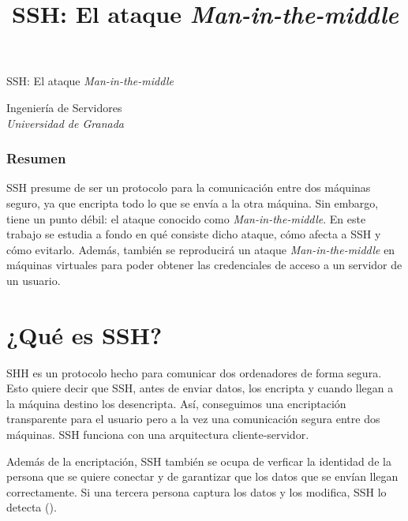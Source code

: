 \documentclass[10pt,a4paper,spanish]{article}
\title{\Huge SSH: El ataque \textit{Man-in-the-middle}}
\begin{document}
\renewcommand{\tablename}{Tabla}

\begin{center}
{\Huge SSH: El ataque \textit{Man-in-the-middle}}\\[0.5cm]
\end{center}
{\large Ingeniería de Servidores}\\[0.5cm]
{\large \textit{Universidad de Granada}}
\begin{center}
\subsubsection*{Resumen}
\begin{minipage}{0.7\textwidth}
{\small SSH presume de ser un protocolo para la comunicación entre dos máquinas seguro, ya que encripta todo lo que se envía a la otra máquina. Sin embargo, tiene un punto débil: el ataque conocido como \textit{Man-in-the-middle}. En este trabajo se estudia a fondo en qué consiste dicho ataque, cómo afecta a SSH y cómo evitarlo. Además, también se reproducirá un ataque \textit{Man-in-the-middle} en máquinas virtuales para poder obtener las credenciales de acceso a un servidor de un usuario.}
\end{minipage}
\end{center}

\section{¿Qué es SSH?}
SHH es un protocolo hecho para comunicar dos ordenadores de forma segura. Esto quiere decir que SSH, antes de enviar datos, los encripta y cuando llegan a la máquina destino los desencripta. Así, conseguimos una encriptación transparente para el usuario pero a la vez una comunicación segura entre dos máquinas. SSH funciona con una arquitectura cliente-servidor.

Además de la encriptación, SSH también se ocupa de verficar la identidad de la persona que se quiere conectar y de garantizar que los datos que se envían llegan correctamente. Si una tercera persona captura los datos y los modifica, SSH lo detecta (\cite{sshbiblio}).
\end{document}
